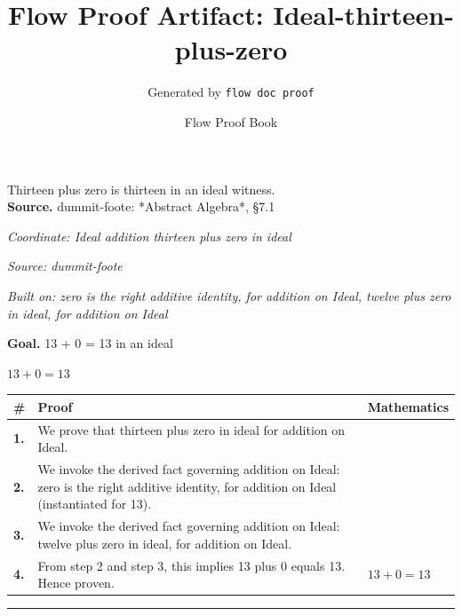 \documentclass[11pt]{article}
\title{Flow Proof Artifact: Ideal-thirteen-plus-zero}
\author{Generated by \texttt{flow doc proof}}
\date{Flow Proof Book}
\theoremstyle{definition}
\begin{document}
\maketitle
Thirteen plus zero is thirteen in an ideal witness.\\[0.5em]
\textbf{Source.} dummit-foote: *Abstract Algebra*, §7.1\\[0.5em]
\bigskip
{}\par
\smallskip\noindent\textit{Coordinate: Ideal \cdot addition \cdot thirteen plus zero in ideal}\par
\smallskip\noindent\textit{Source: dummit-foote}\par
\smallskip\noindent\textit{Built on: zero is the right additive identity, for addition on Ideal, twelve plus zero in ideal, for addition on Ideal}\par
\medskip
\noindent\textbf{Goal.} 13 + 0 = 13 in an ideal\par
\noindent$\displaystyle 13 + 0 = 13$\par
\medskip
\noindent
\begin{tabular}{@{} >{\raggedright\arraybackslash}p{} >{\raggedright\arraybackslash}p{} >{\raggedleft\arraybackslash}p{} @{}}
\textbf{\#} & \textbf{Proof} & \textbf{Mathematics} \\
\midrule
\textbf{1.} & We prove that thirteen plus zero in ideal for addition on Ideal. & \\[0.45em]
\textbf{2.} & We invoke the derived fact governing addition on Ideal: zero is the right additive identity, for addition on Ideal (instantiated for 13). & \\[0.45em]
\textbf{3.} & We invoke the derived fact governing addition on Ideal: twelve plus zero in ideal, for addition on Ideal. & \\[0.45em]
\textbf{4.} & From step 2 and step 3, this implies 13 plus 0 equals 13. Hence proven. & $\displaystyle 13 + 0 = 13$ \\[0.45em]
\bottomrule
\end{tabular}
\label{thm:Ideal-addition-thirteen_plus_zero_in_ideal}
\par\medskip\hrule
\end{document}
